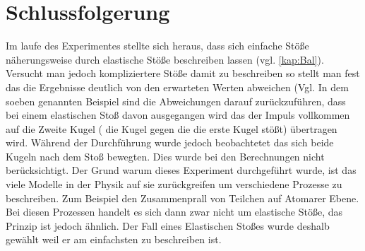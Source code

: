 
\section{Schlussfolgerung}
Im laufe des Experimentes stellte sich heraus, dass sich einfache Stöße näherungsweise durch elastische Stöße beschreiben lassen (vgl. \ref{kap:Bal}). Versucht man jedoch kompliziertere Stöße damit zu beschreiben so stellt man fest das die Ergebnisse deutlich von den erwarteten Werten abweichen (Vgl. %
In dem soeben genannten Beispiel sind die Abweichungen darauf zurückzuführen, dass bei einem elastischen Stoß davon ausgegangen wird das der Impuls vollkommen auf die Zweite Kugel ( die Kugel gegen die die erste Kugel stößt) übertragen wird. Während der Durchführung wurde jedoch beobachtetet das sich beide Kugeln nach dem Stoß bewegten. Dies wurde bei den Berechnungen nicht berücksichtigt.
Der Grund warum dieses Experiment durchgeführt wurde, ist das viele Modelle in der Physik auf sie zurückgreifen um verschiedene Prozesse zu beschreiben. Zum Beispiel den Zusammenprall von Teilchen auf Atomarer Ebene. Bei diesen Prozessen handelt es sich dann zwar nicht um elastische Stöße, das Prinzip ist jedoch ähnlich. Der Fall eines Elastischen Stoßes wurde deshalb gewählt weil er am einfachsten zu beschreiben ist.











